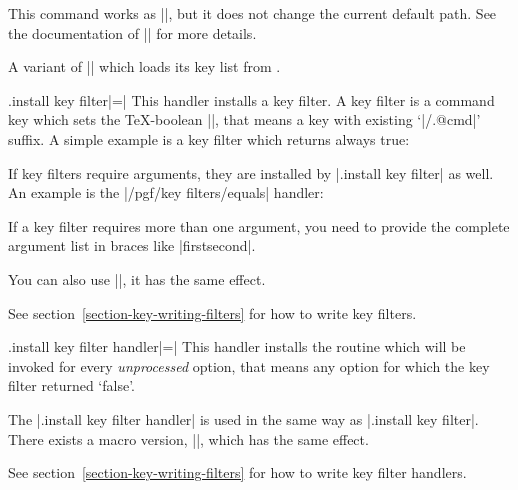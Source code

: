 \begin{command}{\pgfkeysalsofiltered{}}
    This command works as |\pgfkeysfiltered|, but it does not change the
    current default path. See the documentation of |\pgfkeysalso| for more
    details.
\end{command}

\begin{command}{\pgfkeysalsofilteredfrom{}}
    A variant of |\pgfkeysalsofiltered| which loads its key list from
    .
\end{command}

\begin{handler}{{.install key filter}|=|}
    This handler installs a key filter. A key filter is a command key which
    sets the \TeX-boolean |\ifpgfkeysfiltercontinue|, that means a key with
    existing `|/.@cmd|' suffix. A simple example is a key filter which returns
    always true:
\begin{codeexample}
\end{codeexample}
    If key filters require arguments, they are installed by
    |.install key filter| as well. An example is the |/pgf/key filters/equals|
    handler:
\begin{codeexample}[]
\end{codeexample}
    If a key filter requires more than one argument, you need to provide the
    complete argument list in braces like |{{first}{second}}|.

    You can also use |\pgfkeysinstallkeyfilter|, it has the same effect.

    See section~\ref{section-key-writing-filters} for how to write key filters.
\end{handler}

\begin{handler}{{.install key filter handler}|=|}
    This handler installs the routine which will be invoked for every
    \emph{unprocessed} option, that means any option for which the key filter
    returned `false'.

    The |.install key filter handler| is used in the same way as
    |.install key filter|. There exists a macro version,
    |\pgfkeysinstallkeyfilterhandler|,
    which has the same effect.

    See section~\ref{section-key-writing-filters} for how to write key filter
    handlers.
\end{handler}


